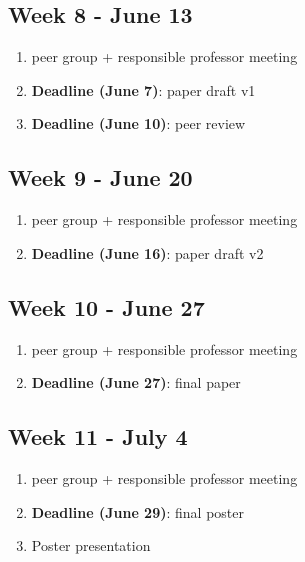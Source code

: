 \documentclass[english]{article}
\begin{document}
\subsection*{Week 8 - June 13}
\begin{enumerate}
\item peer group + responsible professor meeting
\item \textbf{Deadline (June 7)}: paper draft v1
\item \textbf{Deadline (June 10)}: peer review
\end{enumerate}

\subsection*{Week 9 - June 20}
\begin{enumerate}
\item peer group + responsible professor meeting
\item \textbf{Deadline (June 16)}: paper draft v2
\end{enumerate}

\subsection*{Week 10 - June 27}
\begin{enumerate}
\item peer group + responsible professor meeting
\item \textbf{Deadline (June 27)}: final paper
\end{enumerate}

\subsection*{Week 11 - July 4}
\begin{enumerate}
\item peer group + responsible professor meeting
\item \textbf{Deadline (June 29)}: final poster
\item Poster presentation
\end{enumerate}




\end{document}
